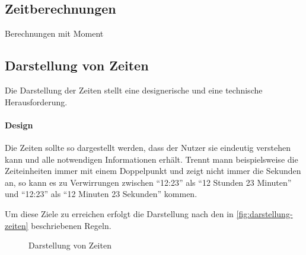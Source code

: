 \subsection{Zeitberechnungen}
Berechnungen mit Moment

\subsection{Darstellung von Zeiten}
Die Darstellung der Zeiten stellt eine designerische und eine technische Herausforderung.

\paragraph{Design}
Die Zeiten sollte so dargestellt werden,
dass der Nutzer sie eindeutig verstehen kann und alle notwendigen Informationen erhält.
Trennt mann beispielsweise die Zeiteinheiten immer mit einem Doppelpunkt und zeigt nicht immer die Sekunden an,
so kann es zu Verwirrungen zwischen \enquote{12:23} als \enquote{12 Stunden 23 Minuten}
und \enquote{12:23} als \enquote{12 Minuten 23 Sekunden} kommen.

Um diese Ziele zu erreichen erfolgt die Darstellung nach den in \autoref{fig:darstellung-zeiten} beschriebenen Regeln.

\begin{figure}[ht!]
    \centering
    \resizebox{\textwidth}{!}{
        
    }
    \caption{Darstellung von Zeiten}
    \label{fig:darstellung-zeiten}
\end{figure}



